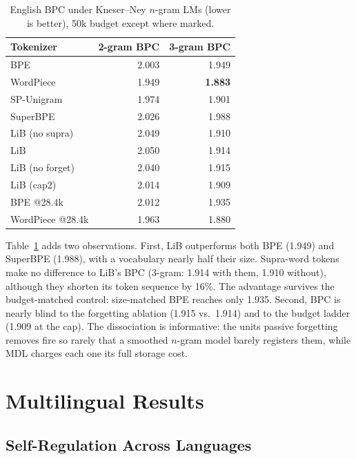 \documentclass[pdflatex,sn-apa]{sn-jnl}
\begin{document}
\begin{table}[t]
\centering
\small
\begin{tabular}{lrr}
\toprule
\textbf{Tokenizer} & \textbf{2-gram BPC} & \textbf{3-gram BPC} \\
\midrule
BPE              & 2.003 & 1.949 \\
WordPiece        & 1.949 & \textbf{1.883} \\
SP-Unigram       & 1.974 & 1.901 \\
SuperBPE         & 2.026 & 1.988 \\
\midrule
LiB (no supra)   & 2.049 & 1.910 \\
LiB              & 2.050 & 1.914 \\
LiB (no forget)  & 2.040 & 1.915 \\
LiB (cap2)       & 2.014 & 1.909 \\
\midrule
BPE @28.4k       & 2.012 & 1.935 \\
WordPiece @28.4k & 1.963 & 1.880 \\
\bottomrule
\end{tabular}
\caption{English BPC under Kneser--Ney $n$-gram LMs (lower is better),
50k budget except where marked.}
\label{tab:bpc_en}
\end{table}

Table~\ref{tab:bpc_en} adds two observations.
First, LiB outperforms both BPE (1.949) and SuperBPE (1.988), with a
vocabulary nearly half their size. Supra-word tokens make no difference to
LiB's BPC (3-gram: 1.914 with them, 1.910 without), although they shorten
its token sequence by 16\%.
The advantage survives the budget-matched control: size-matched BPE reaches
only 1.935.
Second, BPC is nearly blind to the forgetting ablation (1.915 vs.\ 1.914)
and to the budget ladder (1.909 at the cap).
The dissociation is informative: the units passive forgetting removes fire
so rarely that a smoothed $n$-gram model barely registers them, while MDL
charges each one its full storage cost.


\section{Multilingual Results}
\label{sec:multilingual}

\subsection{Self-Regulation Across Languages}
\end{document}
